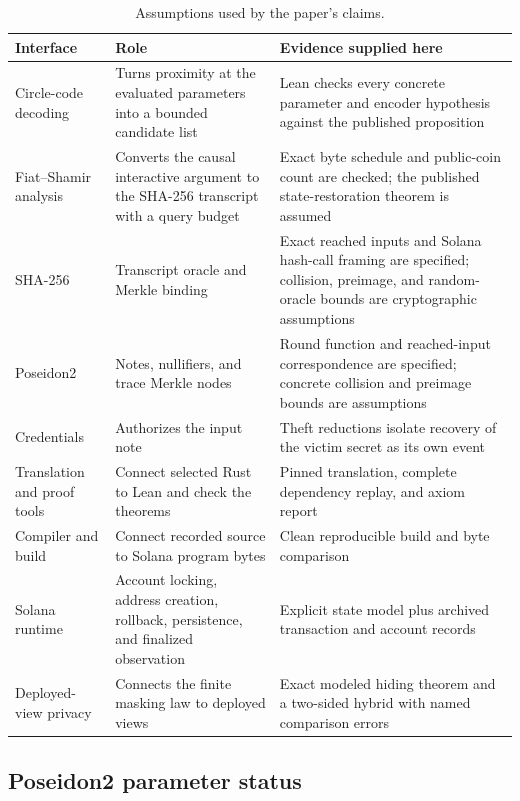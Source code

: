 \begin{table}[t]
\centering
\small
\caption{Assumptions used by the paper's claims.}
\label{tab:assumptions}
\begin{tabularx}{\textwidth}{@{}R{0.22\textwidth}Y Y@{}}
\toprule
Interface & Role & Evidence supplied here \\
\midrule
Circle-code decoding & Turns proximity at the evaluated parameters into a
bounded candidate list & Lean checks every concrete parameter and encoder
hypothesis against the published proposition \\
Fiat--Shamir analysis & Converts the causal interactive argument to the
SHA-256 transcript with a query budget & Exact byte schedule and public-coin
count are checked; the published state-restoration theorem is assumed \\
SHA-256 & Transcript oracle and Merkle binding & Exact reached inputs and
Solana hash-call framing are specified; collision, preimage, and random-oracle
bounds are cryptographic assumptions \\
Poseidon2 & Notes, nullifiers, and trace Merkle nodes & Round function and
reached-input correspondence are specified; concrete collision and preimage
bounds are assumptions \\
Credentials & Authorizes the input note & Theft reductions isolate recovery
of the victim secret as its own event \\
Translation and proof tools & Connect selected Rust to Lean and check the
theorems & Pinned translation, complete dependency replay, and axiom report \\
Compiler and build & Connect recorded source to Solana program bytes & Clean
reproducible build and byte comparison \\
Solana runtime & Account locking, address creation, rollback, persistence,
and finalized observation & Explicit state model plus archived transaction and
account records \\
Deployed-view privacy & Connects the finite masking law to deployed views & Exact
modeled hiding theorem and a two-sided hybrid with named comparison errors \\
\bottomrule
\end{tabularx}
\end{table}

\subsection{Poseidon2 parameter status}


